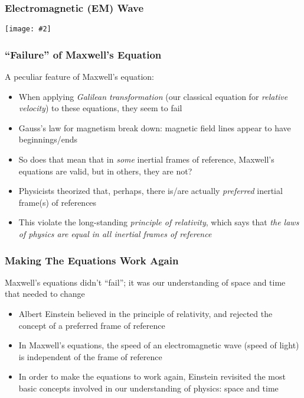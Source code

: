 \documentclass[12pt,aspectratio=169]{beamer}
\newcommand{\pic}[2]{\texttt{[image: \#2]}}\newcommand{\mb}[1]{\mathbf{#1}}
\begin{document}
\begin{frame}
  \frametitle{Electromagnetic (EM) Wave}

  \begin{center}
    \pic{.5}{em-20field.jpg}
  \end{center}
\end{frame}


\begin{frame}
  \frametitle{``Failure'' of Maxwell's Equation}
  A peculiar feature of Maxwell's equation:
  \begin{itemize}
  \item When applying \emph{Galilean transformation} (our classical equation for
    \emph{relative velocity}) to these equations, they seem to fail 
  \item Gauss's law for magnetism break down: magnetic field lines appear to
    have beginnings/ends
  \item So does that mean that in \emph{some} inertial frames of reference,
    Maxwell's equations are valid, but in others, they are not?
  \item Physicists theorized that, perhaps, there is/are actually
    \emph{preferred} inertial frame(s) of references
  \item This violate the long-standing
    \emph{principle of relativity}, which says that
    \emph{the laws of physics are equal in all inertial frames of reference}
  \end{itemize}
\end{frame}


\begin{frame}
  \frametitle{Making The Equations Work Again}
  Maxwell's equations didn't ``fail''; it was our understanding of space and
  time that needed to change
  \begin{itemize}
  \item Albert Einstein believed in the principle of relativity, and rejected
    the concept of a preferred frame of reference
  \item In Maxwell's equations, the speed of an electromagnetic wave (speed of
    light) is independent of the frame of reference
  \item In order to make the equations to work again, Einstein revisited the
    most basic concepts involved in our understanding of physics: space and
    time
  \end{itemize}
\end{frame}
\end{document}
